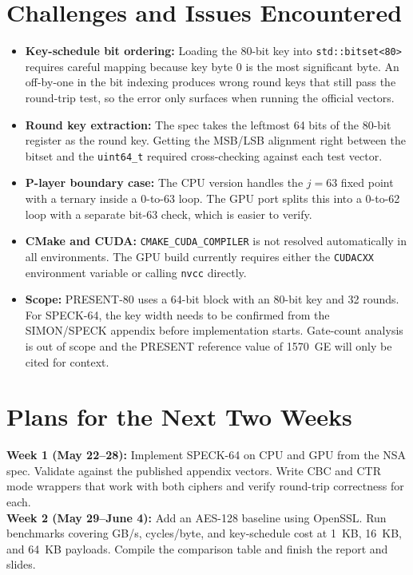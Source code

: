 \documentclass[10pt]{article}
\begin{document}
\section{Challenges and Issues Encountered}
\begin{itemize}
  \item \textbf{Key-schedule bit ordering:} Loading the 80-bit key into
        \texttt{std::bitset<80>} requires careful mapping because key byte 0 is the most
        significant byte. An off-by-one in the bit indexing produces wrong round keys that
        still pass the round-trip test, so the error only surfaces when running the
        official vectors.

  \item \textbf{Round key extraction:} The spec takes the leftmost 64 bits of the
        80-bit register as the round key. Getting the MSB/LSB alignment right between
        the bitset and the \texttt{uint64\_t} required cross-checking against each
        test vector.

  \item \textbf{P-layer boundary case:} The CPU version handles the $j = 63$ fixed
        point with a ternary inside a 0-to-63 loop. The GPU port splits this into a
        0-to-62 loop with a separate bit-63 check, which is easier to verify.

  \item \textbf{CMake and CUDA:} \texttt{CMAKE\_CUDA\_COMPILER} is not resolved
        automatically in all environments. The GPU build currently requires either the
        \texttt{CUDACXX} environment variable or calling \texttt{nvcc} directly.

  \item \textbf{Scope:} PRESENT-80 uses a 64-bit block with an 80-bit key and 32 rounds.
        For SPECK-64, the key width needs to be confirmed from the SIMON/SPECK appendix
        before implementation starts. Gate-count analysis is out of scope and the PRESENT
        reference value of 1570~GE will only be cited for context.
\end{itemize}

\section{Plans for the Next Two Weeks}
\textbf{Week 1 (May 22--28):} Implement SPECK-64 on CPU and GPU from the NSA spec.
Validate against the published appendix vectors. Write CBC and CTR mode wrappers
that work with both ciphers and verify round-trip correctness for each. \\
\textbf{Week 2 (May 29--June 4):} Add an AES-128 baseline using OpenSSL. Run benchmarks
covering GB/s, cycles/byte, and key-schedule cost at 1~KB, 16~KB, and 64~KB payloads.
Compile the comparison table and finish the report and slides.
\end{document}
